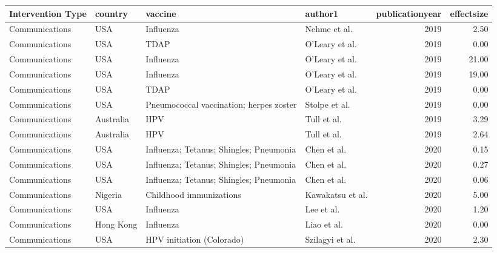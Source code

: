 
\begin{tabular}{llllrr}
\toprule
Intervention Type & country & vaccine & author1 & publicationyear & effectsize\\
\midrule
Communications & USA & Influenza & Nehme et al. & 2019 & 2.50\\
Communications & USA & TDAP & O'Leary et al. & 2019 & 0.00\\
Communications & USA & Influenza & O'Leary et al. & 2019 & 21.00\\
Communications & USA & Influenza & O'Leary et al. & 2019 & 19.00\\
Communications & USA & TDAP & O'Leary et al. & 2019 & 0.00\\
\addlinespace
Communications & USA & Pneumococcal vaccination; herpes zoster & Stolpe et al. & 2019 & 0.00\\
Communications & Australia & HPV & Tull et al. & 2019 & 3.29\\
Communications & Australia & HPV & Tull et al. & 2019 & 2.64\\
Communications & USA & Influenza; Tetanus; Shingles; Pneumonia & Chen et al. & 2020 & 0.15\\
Communications & USA & Influenza; Tetanus; Shingles; Pneumonia & Chen et al. & 2020 & 0.27\\
\addlinespace
Communications & USA & Influenza; Tetanus; Shingles; Pneumonia & Chen et al. & 2020 & 0.06\\
Communications & Nigeria & Childhood immunizations & Kawakatsu et al. & 2020 & 5.00\\
Communications & USA & Influenza & Lee et al. & 2020 & 1.20\\
Communications & Hong Kong & Influenza & Liao et al. & 2020 & 0.00\\
Communications & USA & HPV initiation (Colorado) & Szilagyi et al. & 2020 & 2.30\\
\bottomrule
\end{tabular}
